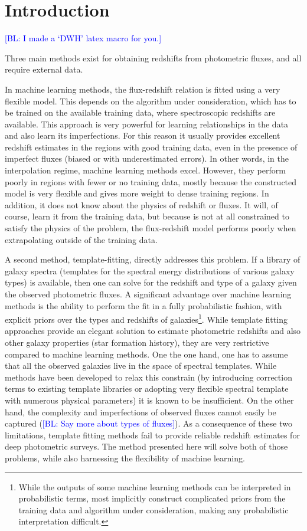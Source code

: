 \documentclass[aps,prd,showpacs,superscriptaddress,groupedaddress]{revtex4}  %
\newcommand{\bl}[1]{\textcolor{blue}{[BL: #1]}}
\begin{document}
  
\section{Introduction}

\bl{I made a `DWH' latex macro for you.}

Three main methods exist for obtaining redshifts from photometric fluxes, and all require external data.

In machine learning methods, the flux-redshift relation is fitted using a very flexible model.
This depends on the algorithm under consideration, which has to be trained on the available training data, where spectroscopic redshifts are available.
This approach is very powerful for learning relationships in the data and also learn its imperfections.
For this reason it usually provides excellent redshift estimates in the regions with good training data, even in the presence of imperfect fluxes (\ie biased or with underestimated errors).
In other words, in the interpolation regime, machine learning methods excel.
However, they perform poorly in regions with fewer or no training data, mostly because the constructed model is very flexible and gives more weight to dense training regions.
In addition, it does not know about the physics of redshift or fluxes. 
It will, of course, learn it from the training data, but because is not at all constrained to satisfy the physics of the problem, the flux-redshift model performs poorly when extrapolating outside of the training data.

A second method, template-fitting, directly addresses this problem. If a library of galaxy spectra (\ie templates for the spectral energy distributions of various galaxy types) is available, then one can solve for the redshift and type of a galaxy given the observed photometric fluxes.
A significant advantage over machine learning methods is the ability to perform the fit in a fully probabilistic fashion, with explicit priors over the types and redshifts of galaxies\footnote{While the outputs of some machine learning methods can be interpreted in probabilistic terms, most implicitly construct complicated priors from the training data and algorithm under consideration, making any probabilistic interpretation difficult.}.
While template fitting approaches provide an elegant solution to estimate photometric redshifts and also other galaxy properties (\eg star formation history), they are very restrictive compared to machine learning methods.
One the one hand, one has to assume that all the observed galaxies live in the space of spectral templates. 
While methods have been developed to relax this constrain (\eg by introducing correction terms to existing template libraries or adopting very flexible spectral template with numerous physical parameters) it is known to be insufficient.
On the other hand, the complexity and imperfections of observed fluxes cannot easily be captured (\bl{Say more about types of fluxes}).
As a consequence of these two limitations, template fitting methods fail to provide reliable redshift estimates for deep photometric surveys.
The method presented here will solve both of those problems, while also harnessing the flexibility of machine learning.
\end{document}
